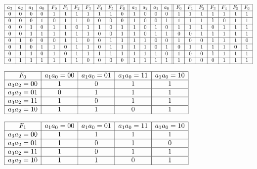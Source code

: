 \begin{center}
$\begin{array}{|c|c|c|c||c|c|c|c|c|c|c||c|c|c|c||c|c|c|c|c|c|c|}
\hline
a_3 & a_2 & a_1 & a_0 & F_0 & F_1 & F_2 & F_3 & F_4 & F_5 & F_6 & a_3 & a_2 & a_1 & a_0 & F_0 & F_1 & F_2 & F_3 & F_4 & F_5 & F_6  \\
\hline
0 & 0 & 0 & 0 & 1 & 1 & 1 & 1 & 1 & 1 & 0 & 1 & 0 & 0 & 0 & 1 & 1 & 1 & 1 & 1 & 1 & 1 \\
\hline
0 & 0 & 0 & 1 & 0 & 1 & 1 & 0 & 0 & 0 & 0 & 1 & 0 & 0 & 1 & 1 & 1 & 1 & 1 & 0 & 1 & 1 \\
\hline
0 & 0 & 1 & 0 & 1 & 1 & 0 & 1 & 1 & 0 & 1 & 1 & 0 & 1 & 0 & 1 & 1 & 1 & 0 & 1 & 1 & 1 \\
\hline
0 & 0 & 1 & 1 & 1 & 1 & 1 & 1 & 0 & 0 & 1 & 1 & 0 & 1 & 1 & 0 & 0 & 1 & 1 & 1 & 1 & 1 \\
\hline
0 & 1 & 0 & 0 & 0 & 1 & 1 & 0 & 0 & 1 & 1 & 1 & 1 & 0 & 0 & 1 & 0 & 0 & 1 & 1 & 1 & 0 \\
\hline
0 & 1 & 0 & 1 & 1 & 0 & 1 & 1 & 0 & 1 & 1 & 1 & 1 & 0 & 1 & 0 & 1 & 1 & 1 & 1 & 0 & 1 \\
\hline
0 & 1 & 1 & 0 & 1 & 0 & 1 & 1 & 1 & 1 & 1 & 1 & 1 & 1 & 0 & 1 & 0 & 0 & 1 & 1 & 1 & 1 \\
\hline
0 & 1 & 1 & 1 & 1 & 1 & 1 & 0 & 0 & 0 & 0 & 1 & 1 & 1 & 1 & 1 & 0 & 0 & 0 & 1 & 1 & 1 \\
\hline
\end{array}$
\end{center}


\begin{center}
$\begin{array}{|c|c|c|c|c|}
\hline
F_0 & a_1a_0=00 & a_1a_0=01 & a_1a_0=11 & a_1a_0=10 \\
\hline
a_3a_2=00  &  1  &  0  & 1   &  1  \\
\hline
a_3a_2=01  &  0  &   1 &  1  &  1  \\
\hline
a_3a_2=11  &  1  &  0  &  1  &  1  \\
\hline
a_3a_2=10  &  1  & 1   &  0  &  1  \\
\hline
\end{array}$
\end{center}

\begin{center}
$\begin{array}{|c|c|c|c|c|}
\hline
F_1 & a_1a_0=00 & a_1a_0=01 & a_1a_0=11 & a_1a_0=10 \\
\hline
a_3a_2=00  & 1   &  1  &  1  &  1  \\
\hline
a_3a_2=01  &  1  &  0  & 1   & 0   \\
\hline
a_3a_2=11  &   1 & 0   & 1   & 1   \\
\hline
a_3a_2=10  &  1  & 1   & 0   & 1   \\
\hline
\end{array}$
\end{center}

